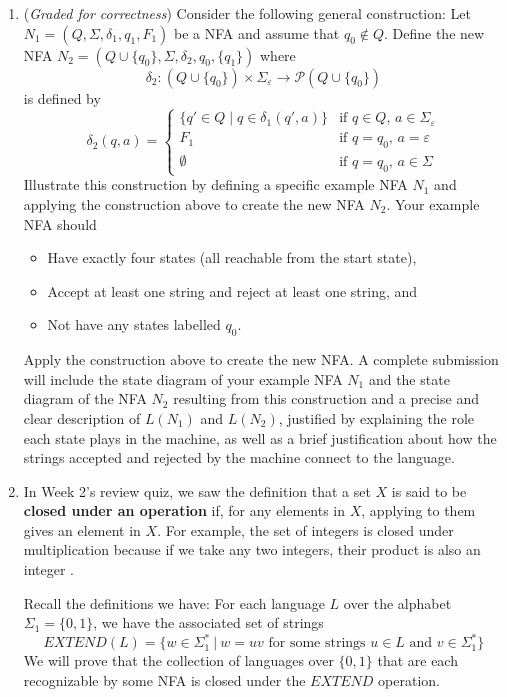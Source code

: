 \documentclass[12pt, oneside]{article}
\newcommand{\gradeCorrect}{({\it Graded for correctness}) }
\begin{document}
\begin{enumerate}[wide, labelwidth=!, labelindent=0pt]
\begin{enumerate}
\item\gradeCorrect Consider the following general construction: Let $N_1 = (Q, \Sigma, \delta_1, q_1, F_1)$ be a NFA
and assume that $q_0 \notin Q$.
Define the new NFA $N_2 = (Q \cup \{q_0\}, \Sigma, \delta_2, q_0, \{q_1\})$ where 
$$\delta_2: (Q \cup \{q_0\}) \times \Sigma_\varepsilon \to \mathcal{P} (Q \cup \{q_0\})$$ is defined by
\[
    \delta_2 (q,a) = \begin{cases}
        \{ q' \in Q \mid q \in \delta_1(q',a)\} &\text{if $q \in Q$, $a \in \Sigma_{\varepsilon}$} \\
        F_1 &\text{if $q =q_0$, $a = \varepsilon$}\\
        \emptyset &\text{if $q = q_0$, $a \in \Sigma$}
    \end{cases}
\]
Illustrate this construction by defining a specific example NFA $N_1$ and applying the 
construction above to create the new NFA $N_2$. Your example NFA should
\begin{itemize}
    \item Have exactly four states (all reachable from the start state),
    \item Accept at least one string and reject at least one string, and
    \item Not have any states labelled $q_0$.
\end{itemize}
Apply the construction above to create the new NFA. A complete submission 
will include the state diagram of your example NFA $N_1$ and the state diagram of the NFA $N_2$ resulting 
from this construction and a precise and clear description of $L(N_1)$ and $L(N_2)$, justified
by explaining the role each state plays in the machine, as well as a brief 
justification about how the strings accepted and rejected by the machine connect to the language.

\item 
In Week 2's review quiz, we saw the definition that a set $X$ is said to be 
{\bf closed under an operation} if, for any elements in
$X$, applying to them gives an element in $X$. For example, the set of
integers is closed under multiplication because if we take any two
integers, their product is also an integer .

Recall the definitions we have: 
For each language $L$ over the alphabet $\Sigma_1 = \{0,1\}$, we have the 
associated set of strings
  $$EXTEND(L) = \{ w \in \Sigma_1^* ~|~ w = uv \text{ for some strings } u \in L \text{ and } v \in \Sigma_1^* \}$$
We will prove that the collection of languages over $\{0,1\}$ that are each 
recognizable by some NFA is closed under the $EXTEND$ operation.


\end{enumerate}
\end{enumerate}
\end{document}
